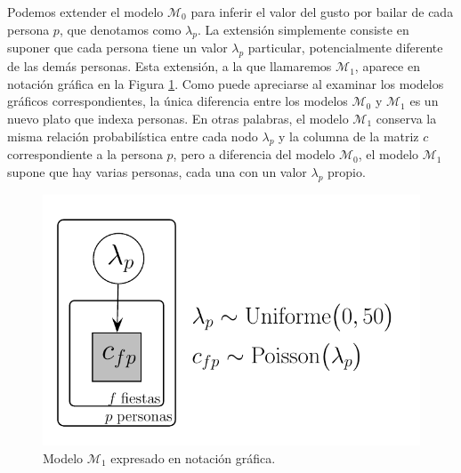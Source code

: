 \documentclass{article}
\begin{document}
\indent Podemos extender el modelo $\mathcal M_0$ para inferir el valor del gusto por bailar de cada persona $p$, que denotamos como $\lambda_p$. La extensión simplemente consiste en suponer que cada persona tiene un valor $\lambda_p$ particular, potencialmente diferente de las demás personas. Esta extensión, a la que llamaremos $\mathcal M_1$, aparece en notación gráfica en la Figura \ref{fig:m_1}. Como puede apreciarse al examinar los modelos gráficos correspondientes, la única diferencia entre los modelos $\mathcal M_0$ y $\mathcal M_1$ es un nuevo plato que indexa personas. En otras palabras, el modelo $\mathcal M_1$ conserva la misma relación probabilística entre cada nodo $\lambda_p$ y la columna de la matriz $c$ correspondiente a la persona $p$, pero a diferencia del modelo $\mathcal M_0$, el modelo $\mathcal M_1$ supone que hay varias personas, cada una con un valor $\lambda_p$ propio.

\begin{figure}[H]
\centerline{\includegraphics[width=.65\textwidth]{m_1.pdf}}
\caption{Modelo $\mathcal M_1$ expresado en notación gráfica.}
\label{fig:m_1}
\end{figure}
\end{document}
